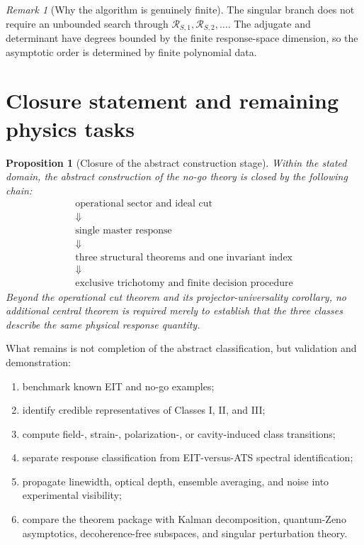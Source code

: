 \documentclass[11pt]{article}
\newtheorem{proposition}[theorem]{Proposition}
\theoremstyle{definition}
\theoremstyle{remark}
\newtheorem{remark}[theorem]{Remark}
\theoremstyle{plain}
\newcommand{\R}{\mathcal R}
\begin{document}
\begin{remark}[Why the algorithm is genuinely finite]
The singular branch does not require an unbounded search through $\R_{S,1},\R_{S,2},\ldots$.  The adjugate and determinant have degrees bounded by the finite response-space dimension, so the asymptotic order is determined by finite polynomial data.
\end{remark}

\section{Closure statement and remaining physics tasks}

\begin{proposition}[Closure of the abstract construction stage]\label{prop:closure}
Within the stated domain, the abstract construction of the no-go theory is closed by the following chain:
\[
\boxed{
\begin{gathered}
 \text{operational sector and ideal cut}\\
 \Downarrow\\[-1mm]
 \text{single master response}\\
 \Downarrow\\[-1mm]
 \text{three structural theorems and one invariant index}\\
 \Downarrow\\[-1mm]
 \text{exclusive trichotomy and finite decision procedure}
\end{gathered}}
\]
Beyond the operational cut theorem and its projector-universality corollary, no additional central theorem is required merely to establish that the three classes describe the same physical response quantity.
\end{proposition}

What remains is not completion of the abstract classification, but validation and demonstration:
\begin{enumerate}[label=(\roman*)]
 \item benchmark known EIT and no-go examples;
 \item identify credible representatives of Classes I, II, and III;
 \item compute field-, strain-, polarization-, or cavity-induced class transitions;
 \item separate response classification from EIT-versus-ATS spectral identification;
 \item propagate linewidth, optical depth, ensemble averaging, and noise into experimental visibility;
 \item compare the theorem package with Kalman decomposition, quantum-Zeno asymptotics, decoherence-free subspaces, and singular perturbation theory.
\end{enumerate}
\end{document}
